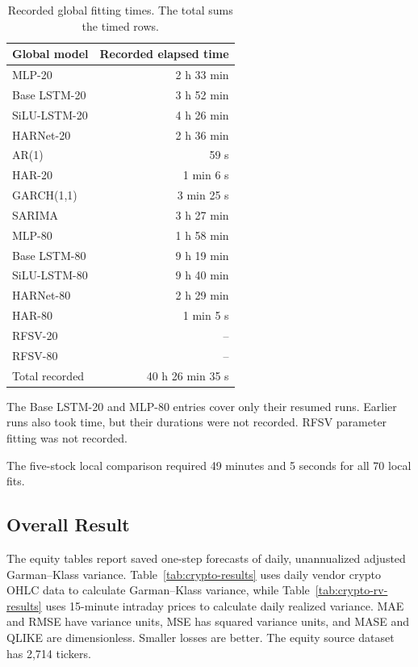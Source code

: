 \documentclass[12pt,a4paper]{article}
\numberwithin{equation}{section}
\numberwithin{table}{section}
\numberwithin{figure}{section}
\begin{document}
\begin{table}[htbp]
\centering
\begin{tabular}{lr}
\hline
Global model & Recorded elapsed time \\
\hline
MLP-20 & 2 h 33 min \\
Base LSTM-20 & 3 h 52 min \\
SiLU-LSTM-20 & 4 h 26 min \\
HARNet-20 & 2 h 36 min \\
AR(1) & 59 s \\
HAR-20 & 1 min 6 s \\
GARCH(1,1) & 3 min 25 s \\
SARIMA & 3 h 27 min \\
MLP-80 & 1 h 58 min \\
Base LSTM-80 & 9 h 19 min \\
SiLU-LSTM-80 & 9 h 40 min \\
HARNet-80 & 2 h 29 min \\
HAR-80 & 1 min 5 s \\
RFSV-20 & -- \\
RFSV-80 & -- \\
\hline
Total recorded & 40 h 26 min 35 s \\
\hline
\end{tabular}
\caption{Recorded global fitting times. The total sums the timed rows.}\label{tab:global-fitting-times}
\end{table}
\FloatBarrier

The Base LSTM-20 and MLP-80 entries cover only their resumed runs. Earlier runs also took time, but their durations were not recorded. RFSV parameter fitting was not recorded. 

The five-stock local comparison required 49 minutes and 5 seconds for all 70 local fits. 

\subsection{Overall Result}
The equity tables report saved one-step forecasts of daily, unannualized adjusted Garman--Klass variance. Table~\ref{tab:crypto-results} uses daily vendor crypto OHLC data to calculate Garman--Klass variance, while Table~\ref{tab:crypto-rv-results} uses 15-minute intraday prices to calculate daily realized variance. MAE and RMSE have variance units, MSE has squared variance units, and MASE and QLIKE are dimensionless. Smaller losses are better. The equity source dataset has 2,714 tickers. 
\end{document}
